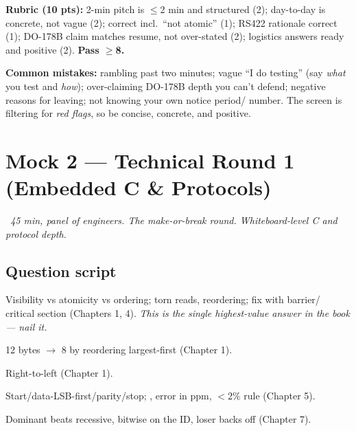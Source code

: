 \begin{scorecard}
\textbf{Rubric (10 pts):} 2-min pitch is $\le$2 min and structured (2);
day-to-day is concrete, not vague (2);  correct incl.\ ``not
atomic'' (1); RS422 rationale correct (1); DO-178B claim matches resume, not
over-stated (2); logistics answers ready and positive (2). \textbf{Pass
$\ge$8.}
\end{scorecard}

\textbf{Common mistakes:} rambling past two minutes; vague ``I do testing''
(say \emph{what} you test and \emph{how}); over-claiming DO-178B depth you
can't defend; negative reasons for leaving; not knowing your own notice period/
number. The screen is filtering for \emph{red flags}, so be concise, concrete,
and positive.

\section{Mock 2 --- Technical Round 1 (Embedded C \& Protocols)}
\emph{~45 min, panel of engineers. The make-or-break round. Whiteboard-level C
and protocol depth.}

\subsection*{Question script}
Visibility vs atomicity vs ordering; torn reads, reordering; fix with barrier/
critical section (Chapters 1, 4). \emph{This is the single highest-value
answer in the book --- nail it.}

12 bytes $\rightarrow$ 8 by reordering largest-first (Chapter 1).

Right-to-left (Chapter 1).

Start/data-LSB-first/parity/stop; , error in ppm, $<$2\%
rule (Chapter 5).

Dominant beats recessive, bitwise on the ID, loser backs off (Chapter 7).

